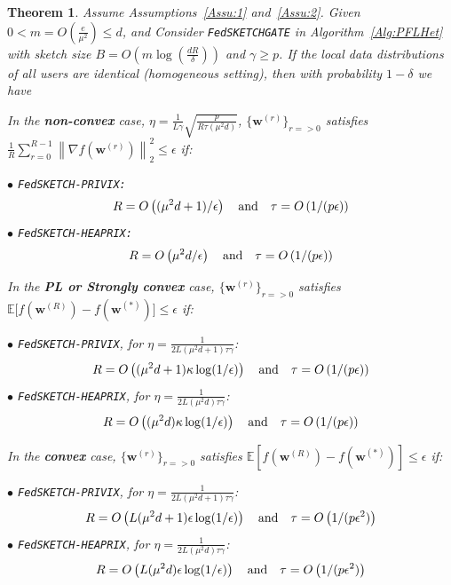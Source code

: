 \documentclass[twoside]{article}
\newtheorem{theorem}{Theorem}
\begin{document}
\begin{theorem}\label{thm:hetreg_case}
Assume Assumptions~\ref{Assu:1} and~\ref{Assu:2}. Given $0<m=O\left(\frac{e}{\mu^2}\right)\leq d$, and Consider \texttt{FedSKETCHGATE} in Algorithm~\ref{Alg:PFLHet} with sketch size $B=O\left(m\log\left(\frac{d R}{\delta}\right)\right)$ and $\gamma\geq p$. 
If the local data distributions of all users are identical (homogeneous setting), then with probability $1-\delta$ we have  



In the \textbf{non-convex} case, $\eta=\frac{1}{L\gamma}\sqrt{\frac{p}{R\tau\left(\mu^2d\right)}}$, $\{ {\boldsymbol{w}}^{(r)}\}_{r=>0}$ satisfies  $\frac{1}{R}\sum_{r=0}^{R-1}\left\|\nabla f({\boldsymbol{w}}^{(r)})\right\|_2^2\leq {\epsilon}$ if: 
 
\noindent $\bullet$ \texttt{FedSKETCH-PRIVIX:}    
\begin{equation}\notag
R=O\left((\mu^2d+1)/\epsilon\right) \quad \textrm{and} \quad \tau=O\left(1/(p\epsilon)\right)
 \end{equation}
\noindent $\bullet$ \texttt{FedSKETCH-HEAPRIX:} 
\begin{equation}\notag
R=O\left(\mu^2d/\epsilon\right) \quad \textrm{and} \quad \tau=O\left(1/(p\epsilon)\right)
 \end{equation}
 
 
In the \textbf{PL or Strongly convex} case, $\{ {\boldsymbol{w}}^{(r)}\}_{r=>0}$ satisfies $\mathbb{E}\Big[f({\boldsymbol{w}}^{(R)})-f({\boldsymbol{w}}^{(*)})\Big]\leq \epsilon$ if: 
 
\noindent $\bullet$ \texttt{FedSKETCH-PRIVIX}, for $\eta=\frac{1}{2L\left({\mu^2d}+1\right)\tau\gamma}$:    
\begin{equation}\notag
R=O\left((\mu^2d+1)\kappa \log(1/\epsilon)\right) \quad \textrm{and} \quad \tau=O\left(1/(p\epsilon)\right)
 \end{equation}
\noindent $\bullet$ \texttt{FedSKETCH-HEAPRIX}, for $\eta=\frac{1}{2L\left({\mu^2d}\right)\tau\gamma}$:
\begin{equation}\notag
R=O\left((\mu^2d)\kappa \log(1/\epsilon)\right) \quad \textrm{and} \quad \tau=O\left(1/(p\epsilon)\right)
 \end{equation}
 
 
 In the \textbf{convex} case, $\{ {\boldsymbol{w}}^{(r)}\}_{r=>0}$ satisfies $ \mathbb{E}[f({\boldsymbol{w}}^{(R)})-f({\boldsymbol{w}}^{(*)})]\leq \epsilon$ if: 
 
\noindent $\bullet$ \texttt{FedSKETCH-PRIVIX}, for $\eta=\frac{1}{2L\left(\mu^2d+1\right)\tau\gamma}$:    
\begin{equation}\notag
R=O\left(L(\mu^2d+1)\epsilon \log(1/\epsilon)\right) \quad \textrm{and} \quad \tau=O\left(1/(p\epsilon^2)\right)
 \end{equation}
\noindent $\bullet$ \texttt{FedSKETCH-HEAPRIX}, for $\eta=\frac{1}{2L\left(\mu^2d\right)\tau\gamma}$:
\begin{equation}\notag
R=O\left(L(\mu^2d)\epsilon \log(1/\epsilon)\right) \quad \textrm{and} \quad \tau=O\left(1/(p\epsilon^2)\right)
 \end{equation}
 \end{theorem}
\end{document}

